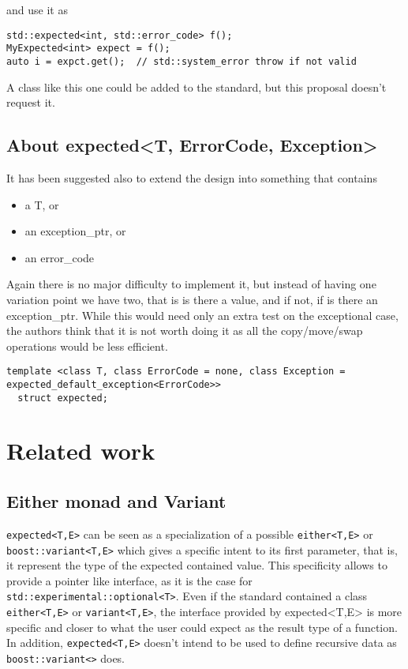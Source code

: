 \documentclass[a4paper,10pt]{article}
\newcommand{\cpp}[1]{\lstinline{#1}}
\begin{document}
and use it as

\begin{lstlisting}
std::expected<int, std::error_code> f();
MyExpected<int> expect = f();
auto i = expct.get();  // std::system_error throw if not valid
\end{lstlisting}

A class like this one could be added to the standard, but this proposal doesn't request it. 

\subsection{About expected<T, ErrorCode, Exception>}

It has been suggested also to extend the design into something that contains 

\begin{itemize}
\item a T, or
\item an exception_ptr, or 
\item an error_code
\end{itemize}

Again there is no major difficulty to implement it, but instead of having one variation point we have two, that is is there a value, and if not, if is there an exception_ptr. While this would need only an extra test on the exceptional case, the authors think that it is not worth doing it as all the copy/move/swap operations would be less efficient.  

\begin{lstlisting}
template <class T, class ErrorCode = none, class Exception = expected_default_exception<ErrorCode>>
  struct expected;
\end{lstlisting}



\section{Related work}

\subsection{Either monad and Variant}

\cpp{expected<T,E>} can be seen as a specialization of a possible \cpp{either<T,E>} or \cpp{boost::variant<T,E>} which gives a specific intent to its first parameter, that is, it represent the type of the expected contained value. This specificity allows to provide a pointer like interface, as it is the case for \cpp{std::experimental::optional<T>}. Even if the standard contained a class \cpp{either<T,E>} or \cpp{variant<T,E>}, the interface provided by expected<T,E> is more specific and closer to what the user could expect as the result type of a function. In addition, \cpp{expected<T,E>} doesn't intend to be used to define recursive data as \cpp{boost::variant<>} does.
\end{document}
